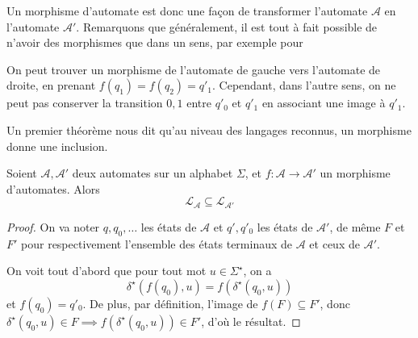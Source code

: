 Un morphisme d'automate est donc une façon de transformer l'automate
$\mathcal A$ en l'automate $\mathcal A'$. Remarquons que généralement, il est
tout à fait possible de n'avoir des morphismes que dans un sens, par exemple
pour
\begin{figure}[h]
  \centering
\end{figure}
On peut trouver un morphisme de l'automate de gauche vers l'automate de droite,
en prenant $f(q_1) = f(q_2) = q'_1$. Cependant, dans l'autre sens, on ne peut
pas conserver la transition $0,1$ entre $q'_0$ et $q'_1$ en associant une image
à $q'_1$.

Un premier théorème nous dit qu'au niveau des langages reconnus, un morphisme
donne une inclusion.

\begin{proposition}
  Soient $\mathcal A, \mathcal A'$ deux automates sur un alphabet $\Sigma$, et
  $f : \mathcal A \to \mathcal A'$ un morphisme d'automates. Alors
  \[\mathcal L_{\mathcal A} \subseteq \mathcal L_{\mathcal A'}\]
\end{proposition}

\begin{proof}
  On va noter $q,q_0,\ldots$ les états de $\mathcal A$ et $q',q'_0$ les états
  de $\mathcal A'$, de même $F$ et $F'$ pour respectivement l'ensemble des
  états terminaux de $\mathcal A$ et ceux de $\mathcal A'$.
  
  On voit tout d'abord que pour tout mot $u\in\Sigma^\star$, on a
  \[\delta^\star(f(q_0),u) = f(\delta^\star(q_0,u))\]
  et $f(q_0) = q'_0$. De plus, par définition, l'image de $f(F)\subseteq F'$,
  donc $\delta^\star(q_0,u) \in F \implies f(\delta^\star(q_0,u))\in F'$, d'où
  le résultat.
\end{proof}

